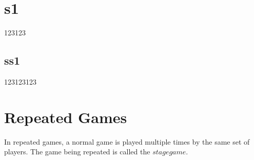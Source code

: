 \documentclass{article}
\begin{document}
\section{s1}

123123

\subsection{ss1}

123123123

\section{Repeated Games}

In repeated games, a normal game is played multiple times by the same set of players. The game being repeated is called the $stage game$. 



\end{document}
